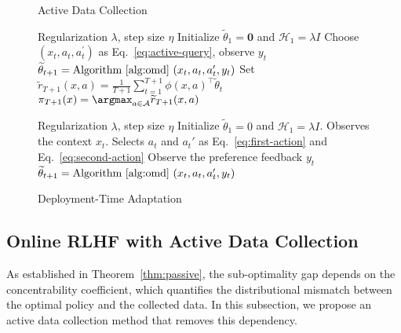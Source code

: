 \begin{figure*}[t]
  \centering
\begin{minipage}[t]{0.48\textwidth}
  \begin{algorithm}[H]
    \caption{Active Data Collection}
    \label{alg:active}
    \begin{algorithmic}[1]
        \REQUIRE Regularization $\lambda$, step size $\eta$
        \STATE Initialize $\widetilde{\theta}_1=\bm{0}$ and $\mathcal{H}_1 = \lambda I$
        \STATE Choose $(x_t, a_t, a_t^{\prime})$ as Eq.~\eqref{eq:active-query}, observe $y_t$
        \STATE $\widetilde{\theta}_{t+1} = \text{Algorithm~\ref{alg:omd} } (x_t, a_t, a_t', y_t)$
        \ENDFOR
        \STATE Set $\widetilde{r}_{T+1}(x, a) = \frac{1}{T+1} \sum_{t=1}^{T+1} \phi(x, a)^\top \widetilde{\theta}_t$
        \ENSURE $\pi_{T+1}(x) = \argmax_{a \in \mathcal{A}} \widetilde{r}_{T+1}(x, a)$
    \end{algorithmic}
  \end{algorithm}
  \end{minipage}
  \hfill
  \begin{minipage}[t]{0.48\textwidth}
  \begin{algorithm}[H]
    \caption{Deployment-Time Adaptation}
    \label{alg:deploy}
    \begin{algorithmic}[1]
        \REQUIRE Regularization $\lambda$, step size $\eta$
        \STATE Initialize $\widetilde{\theta}_1=0$ and $\mathcal{H}_1 = \lambda I$.
        \STATE Observes the context $x_t$.
        \STATE Selects $a_t$ and $a_t'$ as Eq.~\eqref{eq:first-action} and Eq.~\eqref{eq:second-action}
        \STATE Observe the preference feedback $y_t$
        \STATE $\widetilde{\theta}_{t+1} = \text{Algorithm~\ref{alg:omd} } (x_t, a_t, a_t', y_t)$
        \ENDFOR
    \end{algorithmic}
  \end{algorithm}
  \end{minipage}
\vspace{-2mm}
\end{figure*}

\subsection{Online RLHF with Active Data Collection}
As established in Theorem~\ref{thm:passive}, the sub-optimality gap depends on the concentrability coefficient, which quantifies the distributional mismatch between the optimal policy and the collected data. In this subsection, we propose an active data collection method that removes this dependency.

